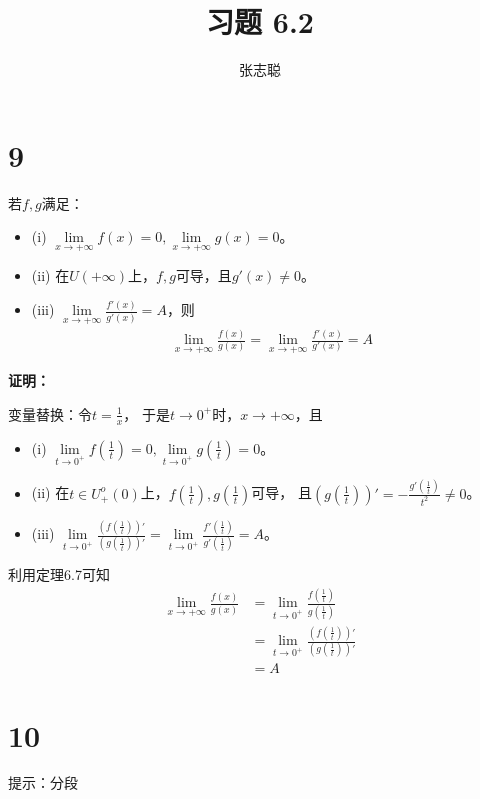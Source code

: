 \documentclass{article}
\begin{document}
\title{习题 6.2}
\author{张志聪}
\maketitle

\section*{9}

若$f,g$满足：
\begin{itemize}
  \item (i) $\lim\limits_{x \to +\infty} f(x) = 0, \lim\limits_{x \to +\infty} g(x) = 0$。
  \item (ii) 在$U(+\infty)$上，$f, g$可导，且$g'(x) \neq 0$。
  \item (iii) $\lim\limits_{x \to +\infty} \frac{f'(x)}{g'(x)} = A$，则
        \begin{align*}
          \lim\limits_{x \to +\infty} \frac{f(x)}{g(x)} = \lim\limits_{x \to +\infty} \frac{f'(x)}{g'(x)} = A
        \end{align*}
\end{itemize}

\textbf{证明：}

变量替换：令$t = \frac{1}{x}$，
于是$t \to 0^+$时，$x \to +\infty$，且
\begin{itemize}
  \item (i) $\lim\limits_{t \to 0^+} f(\frac{1}{t}) = 0, \lim\limits_{t \to 0^+} g(\frac{1}{t}) = 0$。
  \item (ii) 在$t \in U_+^o(0)$上，$f(\frac{1}{t}), g(\frac{1}{t})$可导，
        且$(g(\frac{1}{t}))' = - \frac{g'(\frac{1}{t})}{t^2} \neq 0$。
  \item (iii) $\lim\limits_{t \to 0^+} \frac{(f(\frac{1}{t}))'}{(g(\frac{1}{t}))'} = \lim\limits_{t \to 0^+} \frac{f'(\frac{1}{t})}{g'(\frac{1}{t})} = A$。
\end{itemize}

利用定理6.7可知
\begin{align*}
  \lim\limits_{x \to +\infty} \frac{f(x)}{g(x)}
   & = \lim\limits_{t \to 0^+} \frac{f(\frac{1}{t})}{g(\frac{1}{t})}       \\
   & = \lim\limits_{t \to 0^+} \frac{(f(\frac{1}{t}))'}{(g(\frac{1}{t}))'} \\
   & = A
\end{align*}


\section*{10}

提示：分段
\end{document}
